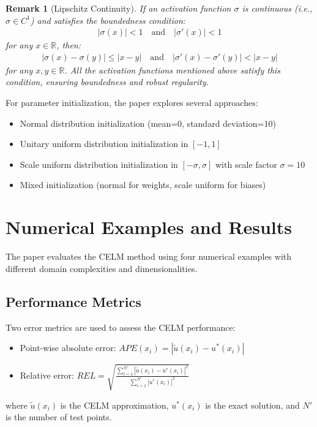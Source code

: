 \documentclass[11pt]{article}
\newtheorem{remark}{Remark}
\begin{document}
\begin{remark}[Lipschitz Continuity]
If an activation function $\sigma$ is continuous (i.e., $\sigma \in C^1$) and satisfies the boundedness condition:
\begin{align}
|\sigma(x)| < 1 \quad \text{and} \quad |\sigma'(x)| < 1
\end{align}
for any $x \in \mathbb{R}$, then:
\begin{align}
|\sigma(x) - \sigma(y)| \leq |x-y| \quad \text{and} \quad |\sigma'(x) - \sigma'(y)| < |x-y|
\end{align}
for any $x, y \in \mathbb{R}$. All the activation functions mentioned above satisfy this condition, ensuring boundedness and robust regularity.
\end{remark}

For parameter initialization, the paper explores several approaches:
\begin{itemize}
    \item Normal distribution initialization (mean=0, standard deviation=10)
    \item Unitary uniform distribution initialization in $[-1, 1]$
    \item Scale uniform distribution initialization in $[-\sigma, \sigma]$ with scale factor $\sigma = 10$
    \item Mixed initialization (normal for weights, scale uniform for biases)
\end{itemize}

\section{Numerical Examples and Results}

The paper evaluates the CELM method using four numerical examples with different domain complexities and dimensionalities.

\subsection{Performance Metrics}

Two error metrics are used to assess the CELM performance:
\begin{itemize}
    \item Point-wise absolute error: $APE(x_i) = |\tilde{u}(x_i) - u^*(x_i)|$
    \item Relative error: $REL = \sqrt{\frac{\sum_{i=1}^{N'} |\tilde{u}(x_i) - u^*(x_i)|^2}{\sum_{i=1}^{N'} |u^*(x_i)|^2}}$
\end{itemize}
where $\tilde{u}(x_i)$ is the CELM approximation, $u^*(x_i)$ is the exact solution, and $N'$ is the number of test points.
\end{document}
